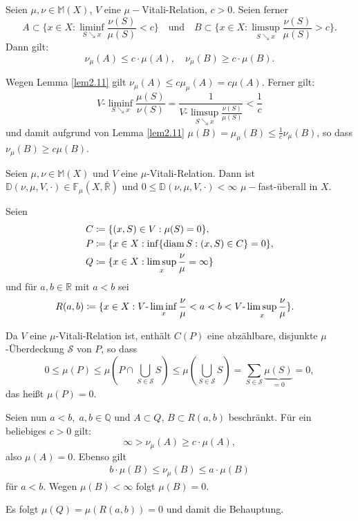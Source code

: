 \documentclass[a4paper,twoside,DIV15,BCOR12mm]{scrbook}
\DeclareMathOperator{\diam}{diam}
\newcommand{\downto}{\mathrel\searrow}
\begin{document}
\begin{korollar}
\label{kor:2.12}
Seien \(\mu,\nu \in \mathbb{M}(X)\), \(V\) eine \(\mu-\)Vitali-Relation, \(c>0\). Seien ferner
\[
A\subset \{x\in X:\liminf_{S\downto x}\frac{\nu(S)}{\mu(S)}<c\}
\quad\text{und}\quad
B\subset\{x\in X:\limsup_{S\downto x}\frac{\nu(S)}{\mu(S)}>c\}.
\]
Dann gilt:
\[
\nu_\mu(A) \leq c\cdot\mu(A), \quad \nu_\mu(B) \geq c\cdot\mu(B).
\]
\end{korollar}
\begin{beweis}
Wegen Lemma \ref{lem2.11} gilt \(\nu_\mu(A) \leq c\mu_\mu(A) = c\mu(A)\). Ferner gilt:
\[
V\text{-}\liminf_{S\downto x}\frac{\mu(S)}{\nu(S)} = \frac1{V\text{-}\limsup_{S\downto x}\frac{\nu(S)}{\mu(S)}} < \frac1c
\]
und damit aufgrund von Lemma \ref{lem2.11} 
$\mu(B) = \mu_\mu(B) \leq \frac1c \nu_\mu(B)$, so dass $\nu_\mu(B) \geq c\mu(B)$.
\end{beweis}

\begin{lemma}
\label{lem2.13}
Seien \(\mu,\nu \in \mathbb{M}(X)\) und \(V\) eine \(\mu\)-Vitali-Relation. Dann ist \(\mathbb{D}(\nu,\mu,V,\cdot) \in \mathbb{F}_\mu(X,\bar{\mathbb{R}})\) und \(0 \leq \mathbb{D}(\nu,\mu,V,\cdot) < \infty\) \(\mu-\)fast-überall in \(X\).
\end{lemma}
\begin{beweis}
Seien
\begin{align*}
C & \da \{ (x,S) \in V : \mu(S) = 0 \}, \\
P & \da \{ x \in X : \inf\{\diam S : (x,S) \in C\} = 0 \}, \\
Q & \da \{ x \in X : \limsup_x\frac\nu\mu = \infty \}
\end{align*}
und für \(a,b \in \mathbb{R}\) mit \(a < b\) sei
\begin{align*} 
R(a,b) & \da \{ x \in X : V\text{-}\liminf_x\frac\nu\mu<a<b<V\text{-}\limsup_x\frac\nu\mu \}.
\end{align*}

Da \(V\) eine \(\mu\)-Vitali-Relation ist, enthält \(C(P)\) eine abzählbare, disjunkte \(\mu\)-Überdeckung \(\mathcal{S}\) von \(P\), so dass
\[
0 \leq \mu(P) \leq \mu(P\cap\bigcup_{S\in\mathcal{S}}S) \leq \mu(\bigcup_{S\in\mathcal{S}}S) = \sum_{S\in\mathcal{S}}\underbrace{\mu(S)}_{=0} = 0 ,
\]
das heißt \(\mu(P) = 0\).

Seien nun \(a<b,\; a,b\in\mathbb{Q}\) und \(A \subset Q\), \(B \subset R(a,b)\) beschränkt. 
Für ein beliebiges \(c > 0\) gilt:
\[
\infty > \nu_\mu(A) \geq c\cdot\mu(A),
\]
also $\mu(A) = 0$. 
Ebenso gilt
\begin{align*}
b\cdot\mu(B) \leq \nu_\mu(B) \leq a\cdot\mu(B)
\end{align*}
für $a < b$. Wegen $\mu(B)<\infty$ folgt \(\mu(B)=0\).

Es folgt \(\mu(Q) = \mu(R(a,b)) = 0\) und damit die Behauptung.
\end{beweis}
\end{document}
